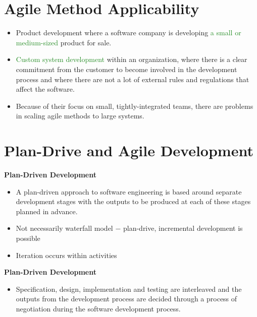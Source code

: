 \documentclass{report}
\newcommand{\textg}[1]{\textcolor{ForestGreen}{#1}}
\begin{document}
\newpage
\section{Agile Method Applicability}
\begin{itemize}
  \item Product development where a software company is developing \textg{a small or medium-sized} product for sale.
  \item \textg{Custom system development} within an organization, where there is a clear commitment from the customer to become involved in the development process and where there are not a lot of external rules and regulations that affect the software.
  \item Because of their focus on small, tightly-integrated teams, there are problems in scaling agile methods to large systems.
\end{itemize}  
  
\section{Plan-Drive and Agile Development}
\noindent\textbf{Plan-Driven Development}
\begin{itemize}
  \item A plan-driven approach to software engineering is based around separate development stages with the outputs to be produced at each of these stages planned in advance.
  \item Not necessarily waterfall model $-$ plan-drive, incremental development is possible
  \item Iteration occurs within activities
\end{itemize}  
\textbf{Plan-Driven Development}
\begin{itemize}
  \item Specification, design, implementation and testing are interleaved and the outputs from the development process are decided through a process of negotiation during the software development process.
\end{itemize} 
\end{document}
